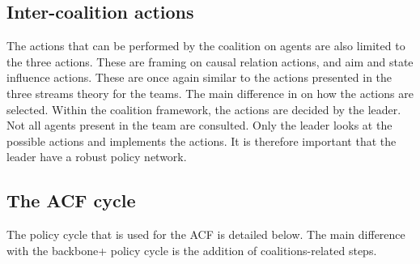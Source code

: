 \subsection{Inter-coalition actions}

The actions that can be performed by the coalition on agents are also limited to the three actions. These are framing on causal relation actions, and aim and state influence actions. These are once again similar to the actions presented in the three streams theory for the teams. The main difference in on how the actions are selected. Within the coalition framework, the actions are decided by the leader. Not all agents present in the team are consulted. Only the leader looks at the possible actions and implements the actions. It is therefore important that the leader have a robust policy network. 

\subsection{The ACF cycle}

The policy cycle that is used for the ACF is detailed below. The main difference with the backbone+ policy cycle is the addition of coalitions-related steps.

